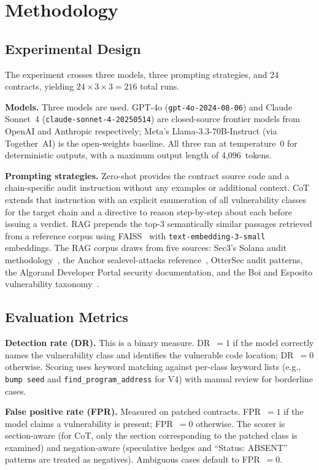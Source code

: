 \documentclass[runningheads]{llncs}
\begin{document}
\section{Methodology}
\label{sec:methodology}

\subsection{Experimental Design}

The experiment crosses three models, three prompting strategies, and 24
contracts, yielding $24 \times 3 \times 3 = 216$ total runs.

\textbf{Models.} Three models are used. GPT-4o (\texttt{gpt-4o-2024-08-06})
and Claude Sonnet~4 (\texttt{claude-sonnet-4-20250514}) are closed-source
frontier models from OpenAI and Anthropic respectively; Meta's
Llama-3.3-70B-In\-struct (via Together~AI) is the open-weights baseline.
All three ran at temperature~0 for deterministic outputs, with a maximum
output length of 4{,}096~tokens.

\textbf{Prompting strategies.}
Zero-shot provides the contract source code and a chain-specific audit
instruction without any examples or additional context.
CoT extends that instruction with an explicit enumeration of all vulnerability
classes for the target chain and a directive to reason step-by-step about each
before issuing a verdict.
RAG prepends the top-3 semantically similar passages retrieved from a reference
corpus using FAISS~\cite{liu2024llm4vuln} with \texttt{text-embedding-3-small}
embeddings.
The RAG corpus draws from five sources: Sec3's Solana audit
methodology~\cite{sec32022audit}, the Anchor sealevel-attacks
reference~\cite{ferrante2022sealevel}, OtterSec audit patterns, the Algorand
Developer Portal security documentation, and the Boi and Esposito vulnerability
taxonomy~\cite{boi2025prompt}.

\subsection{Evaluation Metrics}

\textbf{Detection rate (DR).} This is a binary measure. DR~$= 1$ if the model
correctly names the vulnerability class and identifies the vulnerable code
location; DR~$= 0$ otherwise.
Scoring uses keyword matching against per-class keyword lists (e.g.,
\texttt{bump seed} and \texttt{find\_program\_address} for V4) with manual
review for borderline cases.

\textbf{False positive rate (FPR).} Measured on patched contracts.
FPR~$= 1$ if the model claims a vulnerability is present; FPR~$= 0$ otherwise.
The scorer is section-aware (for CoT, only the section corresponding to the
patched class is examined) and negation-aware (speculative hedges and
``Status: ABSENT'' patterns are treated as negatives).
Ambiguous cases default to FPR~$= 0$.
\end{document}

